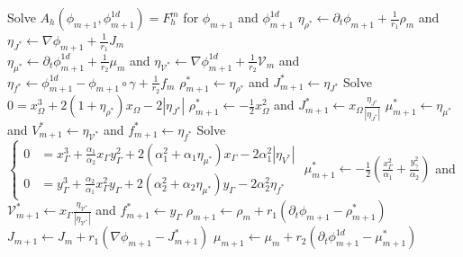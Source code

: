 \documentclass{article}
\begin{document}
\begin{algorithm}[t]
    \caption{Augmented Lagrangian Method}\label{alg:AugmLagr}
    \begin{algorithmic}
            \STATE Solve $A_h (\phi_{m+1}, \phi^{1d}_{m+1}) = F^m_h$ for $\phi_{m+1}$ and $\phi^{1d}_{m+1}$
            \STATE $\eta_{\rho^*} \leftarrow \partial_t\phi_{m+1} + \frac{1}{r_1}\rho_m$ and $\eta_{J^*} \leftarrow \nabla\phi_{m+1} + \frac{1}{r_1}J_m$\\ $\eta_{\mu^*} \leftarrow \partial_t\phi^{1d}_{m+1} + \frac{1}{r_2}\mu_m$ and $\eta_{\mathcal{V}^*} \leftarrow \nabla\phi^{1d}_{m+1} + \frac{1}{r_2}\mathcal{V}_m$ and $\eta_{f^*} \leftarrow \phi^{1d}_{m+1} - \phi_{m+1}\circ\gamma + \frac{1}{r_2}f_m$
                \STATE $\rho^*_{m+1}\leftarrow \eta_{\rho^*}$ and $J^*_{m+1}\leftarrow \eta_{J^*}$
            \ELSE
                \STATE Solve $0 = x_\Omega^3 + 2 (1+\eta_{\rho^*}) x_\Omega - 2 | \eta_{J^*}|$
                \STATE $\rho^*_{m+1}\leftarrow -\frac{1}{2}x_\Omega^2$ and $J^*_{m+1}\leftarrow x_\Omega\frac{\eta_{J^*}}{| \eta_{J^*} |}$
            \ENDIF
                \STATE $\mu^*_{m+1}\leftarrow \eta_{\mu^*}$ and $V^*_{m+1}\leftarrow \eta_{\mathcal{V}^*}$ and $f^*_{m+1}\leftarrow \eta_{f^*}$
            \ELSE
                \STATE Solve $\begin{cases}
                0 &= x_\Gamma^3 + \frac{\alpha_1}{\alpha_2} x_\Gamma y_\Gamma^2 + 2 \left( \alpha_1^2 + \alpha_1\eta_{\mu^*}\right) x_\Gamma - 2 \alpha_1^2 |\eta_{V^*}|\\
                0 &= y_\Gamma^3 + \frac{\alpha_2}{\alpha_1} x_\Gamma^2 y_\Gamma + 2 \left( \alpha_2^2 + \alpha_2\eta_{\mu^*}\right) y_\Gamma - 2 \alpha_2^2 \eta_{f^*}
            \end{cases}$
                \STATE $\mu^*_{m+1}\leftarrow -\frac{1}{2}\left(\frac{x_\Gamma^2}{\alpha_1} + \frac{y_\gamma^2}{\alpha_2} \right)$ and $\mathcal{V}^*_{m+1}\leftarrow  x_\Gamma \frac{\eta_{\mathcal{V}^*}}{|\eta_{\mathcal{V}^*}|}$ and $f^*_{m+1}\leftarrow y_\Gamma$
            \ENDIF
            \STATE $\rho_{m+1} \leftarrow \rho_{m} + r_1 \left( \partial_t\phi_{m+1} - \rho^*_{m+1} \right)$
            \STATE $J_{m+1} \leftarrow J_{m} + r_1 \left( \nabla\phi_{m+1} - J^*_{m+1} \right)$
            \STATE $\mu_{m+1} \leftarrow \mu_{m} + r_2 \left( \partial_t\phi^{1d}_{m+1} - \mu^*_{m+1}\right)$

\end{algorithmic}
\end{algorithm}
\end{document}
